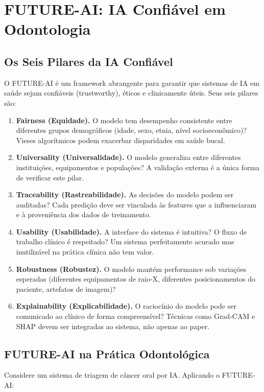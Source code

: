 \section{FUTURE-AI: IA Confiável em Odontologia}

\subsection{Os Seis Pilares da IA Confiável}

O FUTURE-AI  é um framework abrangente para garantir que sistemas de IA em saúde sejam confiáveis (trustworthy), éticos e clinicamente úteis. Seus seis pilares são:

\begin{enumerate}
    \item \textbf{Fairness (Equidade).} O modelo tem desempenho consistente entre diferentes grupos demográficos (idade, sexo, etnia, nível socioeconômico)? Vieses algorítmicos podem exacerbar disparidades em saúde bucal.
    \item \textbf{Universality (Universalidade).} O modelo generaliza entre diferentes instituições, equipamentos e populações? A validação externa é a única forma de verificar este pilar.
    \item \textbf{Traceability (Rastreabilidade).} As decisões do modelo podem ser auditadas? Cada predição deve ser vinculada às features que a influenciaram e à proveniência dos dados de treinamento.
    \item \textbf{Usability (Usabilidade).} A interface do sistema é intuitiva? O fluxo de trabalho clínico é respeitado? Um sistema perfeitamente acurado mas inutilizável na prática clínica não tem valor.
    \item \textbf{Robustness (Robustez).} O modelo mantém performance sob variações esperadas (diferentes equipamentos de raio-X, diferentes posicionamentos do paciente, artefatos de imagem)?
    \item \textbf{Explainability (Explicabilidade).} O raciocínio do modelo pode ser comunicado ao clínico de forma compreensível? Técnicas como Grad-CAM e SHAP devem ser integradas ao sistema, não apenas ao paper.
\end{enumerate}

\subsection{FUTURE-AI na Prática Odontológica}

Considere um sistema de triagem de câncer oral por IA. Aplicando o FUTURE-AI:

